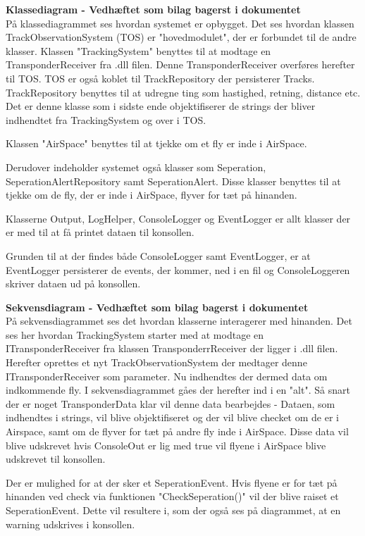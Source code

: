 \textbf{Klassediagram - Vedhæftet som bilag bagerst i dokumentet} \\
På klassediagrammet ses hvordan systemet er opbygget. \tabularnewline
Det ses hvordan klassen TrackObservationSystem (TOS) er "hovedmodulet", der er forbundet til de andre klasser.
Klassen "TrackingSystem" benyttes til at modtage en TransponderReceiver fra .dll filen. Denne TransponderReceiver overføres herefter til TOS.
TOS er også koblet til TrackRepository der persisterer Tracks. TrackRepository benyttes til at udregne ting som hastighed, retning, distance etc. Det er denne klasse som i sidste ende objektifiserer de strings der bliver indhendtet fra TrackingSystem og over i TOS.

Klassen "AirSpace" benyttes til at tjekke om et fly er inde i AirSpace.

Derudover indeholder systemet også klasser som Seperation, SeperationAlertRepository samt SeperationAlert. Disse klasser benyttes til at tjekke om de fly, der er inde i AirSpace, flyver for tæt på hinanden. 

Klasserne Output, LogHelper, ConsoleLogger og EventLogger er allt klasser der er med til at få printet dataen til konsollen. 

Grunden til at der findes både ConsoleLogger samt EventLogger, er at EventLogger persisterer de events, der kommer, ned i en fil og ConsoleLoggeren skriver dataen ud på konsollen. \newline

\textbf{Sekvensdiagram - Vedhæftet som bilag bagerst i dokumentet} \\
På sekvensdiagrammet ses det hvordan klasserne interagerer med hinanden. \tabularnewline
Det ses her hvordan TrackingSystem starter med at modtage en ITransponderReceiver fra klassen TransponderrReceiver der ligger i .dll filen. \tabularnewline
Herefter oprettes et nyt TrackObservationSystem der medtager denne ITransponderReceiver som parameter.\tabularnewline
Nu indhendtes der dermed data om indkommende fly. I sekvensdiagrammet gåes der herefter ind i en "alt". \tabularnewline
Så snart der er noget TransponderData klar vil denne data bearbejdes - Dataen, som indhendtes i strings, vil blive objektifiseret og der vil blive checket om de er i Airspace, samt om de flyver for tæt på andre fly inde i AirSpace.
Disse data vil blive udskrevet hvis ConsoleOut er lig med true vil flyene i AirSpace blive udskrevet til konsollen.

Der er mulighed for at der sker et SeperationEvent. \tabularnewline
Hvis flyene er for tæt på hinanden ved check via funktionen "CheckSeperation()" vil der blive raiset et SeperationEvent. 
Dette vil resultere i, som der også ses på diagrammet, at en warning udskrives i konsollen.


